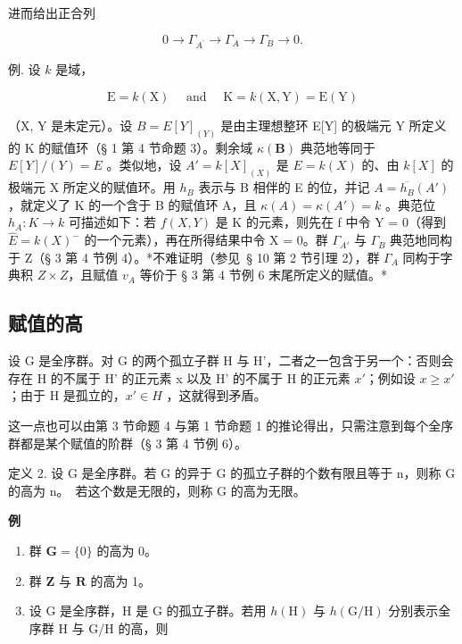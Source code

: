 进而给出正合列

\[
0 \rightarrow \Gamma_ {A ^ {\prime}} \rightarrow \Gamma_ {A} \rightarrow \Gamma_ {B} \rightarrow 0.
\]

例. 设 \(k\) 是域，

\[
\mathrm{E} = k (\mathrm{X}) \quad \text { and } \quad \mathrm{K} = k (\mathrm{X}, \mathrm{Y}) = \mathrm{E} (\mathrm{Y})
\]

（X, Y 是未定元）。设 \(B = E[Y]_{(Y)}\) 是由主理想整环 E{[}Y{]} 的极端元 Y 所定义的 K 的赋值环（§ 1 第 4 节命题 3）。剩余域 \(\kappa(\mathbf{B})\) 典范地等同于 \(E[Y]/(Y) = E\) 。类似地，设 \(A' = k[X]_{(X)}\) 是 \(E = k(X)\) 的、由 \(k[X]\) 的极端元 X 所定义的赋值环。用 \(h_{B}\) 表示与 B 相伴的 E 的位，并记 \(A = \overline{h_{B}}(A')\) ，就定义了 K 的一个含于 B 的赋值环 A，且 \(\kappa(A) = \kappa(A') = k\) 。典范位 \(h_{A}: K \to k\) 可描述如下：若 \(f(X, Y)\) 是 K 的元素，则先在 f 中令 Y = 0（得到 \(\hat{E} = k(X)^{-}\) 的一个元素），再在所得结果中令 X = 0。群 \(\Gamma_{A'}\) 与 \(\Gamma_{B}\) 典范地同构于 Z（§ 3 第 4 节例 4）。*不难证明（参见~§ 10 第 2 节引理 2），群 \(\Gamma_{A}\) 同构于字典积 \(Z \times Z\)，且赋值 \(v_{A}\) 等价于 § 3 第 4 节例 6 末尾所定义的赋值。*

\subsection{赋值的高}

设 G 是全序群。对 G 的两个孤立子群 H 与 H'，二者之一包含于另一个：否则会存在 H 的不属于 H' 的正元素 x 以及 H' 的不属于 H 的正元素 \(x'\)；例如设 \(x \geqslant x'\) ；由于 H 是孤立的，\(x' \in H\) ，这就得到矛盾。

这一点也可以由第 3 节命题 4 与第 1 节命题 1 的推论得出，只需注意到每个全序群都是某个赋值的阶群（§ 3 第 4 节例 6）。

定义 2. 设 G 是全序群。若 G 的异于 G 的孤立子群的个数有限且等于 n，则称 G 的高为 n。~若这个数是无限的，则称 G 的高为无限。

\textbf{例}\par

\begin{enumerate}
\def\labelenumi{(\arabic{enumi})}
\item
  群 \(\mathbf{G} = \{0\}\) 的高为 0。
\item
  群 \(\mathbf{Z}\) 与 \(\mathbf{R}\) 的高为 1。
\item
  设 G 是全序群，H 是 G 的孤立子群。若用 \(h(\mathrm{H})\) 与 \(h(\mathrm{G}/\mathrm{H})\) 分别表示全序群 H 与 G/H 的高，则
\end{enumerate}

